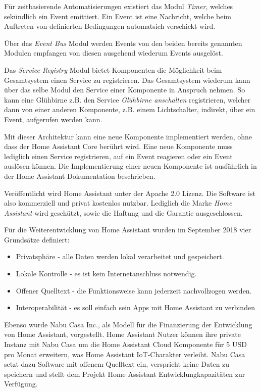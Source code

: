 Für zeitbasierende Automatisierungen existiert das Modul \textit{Timer}, welches sekündlich ein Event emittiert.
Ein Event ist eine Nachricht, welche beim Auftreten von definierten Bedingungen automatsich verschickt wird.

Über das \textit{Event Bus} Modul werden Events von den beiden bereits genannten Modulen empfangen von diesen ausgehend wiederum Events ausgelöst.

Das \textit{Service Registry} Modul bietet Komponenten die Möglichkeit beim Gesamtsystem einen Service zu registrieren.
Das Gesamtsystem wiederum kann über das selbe Modul den Service einer Komponente in Anspruch nehmen.
So kann eine Glühbirne z.B. den Service \textit{Glühbirne anschalten} registrieren, welcher dann von einer anderen Komponente, z.B. einem Lichtschalter, indirekt, über ein Event, aufgerufen werden kann.

Mit dieser Architektur kann eine neue Komponente implementiert werden, ohne dass der Home Assistant Core berührt wird.
Eine neue Komponente muss lediglich einen Service registrieren, auf ein Event reagieren oder ein Event auslösen können.
Die Implementierung einer neuen Komponente ist ausführlich in der Home Assistant Dokumentation beschrieben.

Veröffentlicht wird Home Assistant unter der Apache 2.0 Lizenz.
Die Software ist also kommerziell und privat kostenlos nutzbar.
Lediglich die Marke \textit{Home Assistant} wird geschützt, sowie die Haftung und die Garantie ausgeschlossen.

Für die Weiterentwicklung von Home Assistant wurden im September 2018 vier Grundsätze definiert:

\begin{itemize}
	\item Privatsphäre - alle Daten werden lokal verarbeitet und gespeichert.
	\item Lokale Kontrolle - es ist kein Internetanschluss notwendig.
	\item Offener Quelltext - die Funktionsweise kann jederzeit nachvollzogen werden.
	\item Interoperabilität - es soll einfach sein Apps mit Home Assistant zu verbinden
\end{itemize}

Ebenso wurde Nabu Casa Inc., als Modell für die Finanzierung der Entwicklung von Home Assistant, vorgestellt.
Home Assistant Nutzer können ihre private Instanz mit Nabu Casa um die Home Assistant Cloud Komponente für 5 USD pro Monat erweitern, was Home Assistant \ac{IoT}-Charakter verleiht.
Nabu Casa setzt dazu Software mit offenem Quelltext ein, verspricht keine Daten zu speichern und stellt dem Projekt Home Assistant Entwicklungkapazitäten zur Verfügung.

